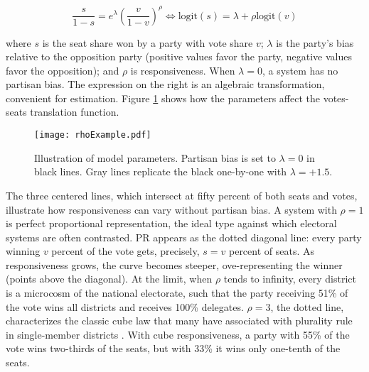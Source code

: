 \documentclass[letter,12pt]{article}
\begin{document}
\begin{equation}\label{E:kingBi}
 \frac{s}{1-s} = e^\lambda  \left(\frac{v}{1-v}\right)^\rho \iff
 \text{logit}(s) = \lambda + \rho  \text{logit}(v)
\end{equation}\label{E:cubeLaw}

\noindent where $s$ is the seat share won by a party with vote share $v$; $\lambda$ is the party's bias relative to the opposition party (positive values favor the party, negative values favor the opposition); and $\rho$ is responsiveness. When $\lambda=0$, a system has no partisan bias. The expression on the right is an algebraic transformation, convenient for estimation. Figure \ref{F:lambdaRhoEx} shows how the parameters affect the votes-seats translation function. 


\begin{figure}
\begin{center}
    \texttt{[image: rhoExample.pdf]} 
\caption{Illustration of model parameters. Partisan bias is set to $\lambda=0$ in black lines. Gray lines replicate the black one-by-one with $\lambda=+1.5$.}\label{F:lambdaRhoEx}
\end{center}
\end{figure}

The three centered lines, which intersect at fifty percent of both seats and votes, illustrate how responsiveness can vary without partisan bias. A system with $\rho=1$ is perfect proportional representation, the ideal type against which electoral systems are often contrasted. PR appears as the dotted diagonal line: every party winning $v$ percent of the vote gets, precisely, $s=v$ percent of seats. As responsiveness grows, the curve becomes steeper, ove-representing the winner (points above the diagonal). At the limit, when $\rho$ tends to infinity, every district is a microcosm of the national electorate, such that the party receiving 51\% of the vote wins all districts and receives 100\% delegates. $\rho=3$, the dotted line, characterizes the classic cube law that many have associated with plurality rule in single-member districts \citep{taagepera.CubeLaw.1973}. With cube responsiveness, a party with 55\% of the vote wins two-thirds of the seats, but with 33\% it wins only one-tenth of the seats. 
\end{document}
